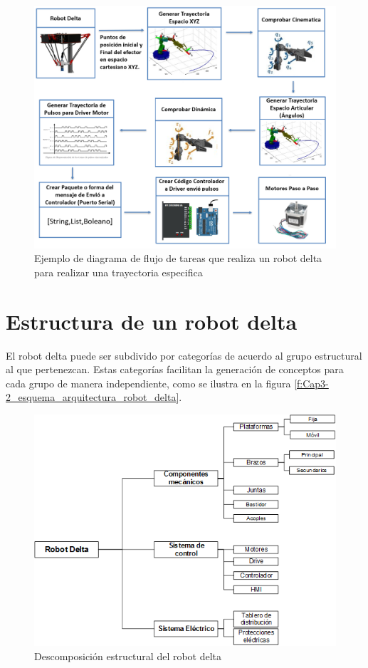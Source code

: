     \begin{figure}[h]
        \centering
        \includegraphics[width=1\linewidth]{Main/Chapter3/Images3/3-1/diagrama-de-flujo-robot.png}
        \caption{Ejemplo de diagrama de flujo de tareas que realiza un robot delta para realizar una trayectoria especifica}
        \label{f:Cap3-1_diagrama_de_flujo_robot_accion}
    \end{figure}
        \newpage
        
\section{Estructura de un robot delta}

    El robot delta puede ser subdivido por categorías de acuerdo al grupo estructural al que pertenezcan. Estas categorías facilitan la generación de conceptos para cada grupo de manera independiente, como se ilustra en la figura \eqref{f:Cap3-2_esquema_arquitectura_robot_delta}.
    
    \begin{figure}[h]
        \centering
        \includegraphics[width=0.8\linewidth]{Main/Chapter3/Images3/3-2/esquema-categorias-estructura.png}
        \caption{Descomposición estructural del robot delta \cite{Robot_parelelo_tipo}}
        \label{f:Cap3-2_esquema_arquitectura_robot_delta}
    \end{figure}
    
